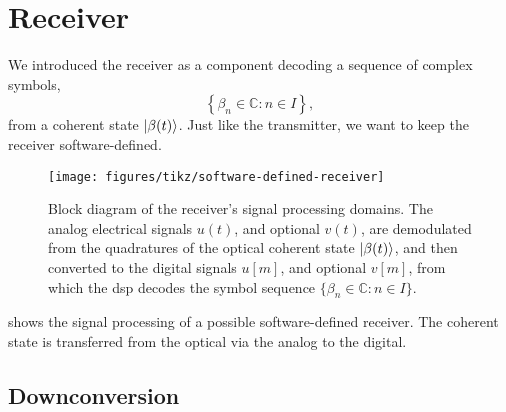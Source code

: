 \section{Receiver}
\FloatBarrier

We introduced the receiver as a component decoding a sequence of complex symbols,
\begin{equation}
	\left\{
		\beta_n
		\in
		\mathbb{C}
		\colon
		n\in I
	\right\}
	,
\end{equation}
from a coherent state $\lvert\beta(t)\rangle$.
Just like the transmitter, we want to keep the receiver software-defined.
\begin{figure}[htb]
	\centering
	\texttt{[image: figures/tikz/software-defined-receiver]}
	\caption{Block diagram of the receiver's signal processing domains. The analog electrical signals $u(t)$, and optional $v(t)$, are demodulated from the quadratures of the optical coherent state $\lvert\beta(t)\rangle$, and then converted to the digital signals $u[m]$, and optional $v[m]$, from which the \gls{dsp} decodes the symbol sequence $\{\beta_n\in\mathbb{C}\colon n\in I\}$.}\label{fig:software_defined_receiver}
\end{figure}
 shows the signal processing of a possible software-defined receiver.
The coherent state is transferred from the optical via the analog to the digital.

\FloatBarrier
\subsection{Downconversion}

